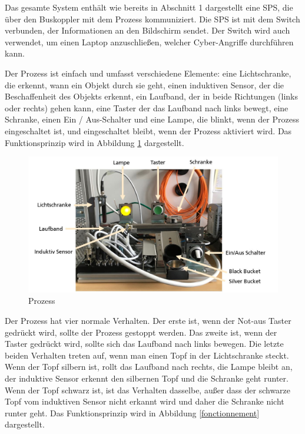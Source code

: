 \documentclass[12pt,a4paper]{scrartcl}
\numberwithin{equation}{section}
\begin{document}
Das gesamte System enthält wie bereits in Abschnitt 1 dargestellt eine SPS, die über den Buskoppler mit dem Prozess kommuniziert. Die SPS ist mit dem Switch verbunden, der Informationen an den Bildschirm sendet. Der Switch wird auch verwendet, um einen Laptop anzuschließen, welcher Cyber-Angriffe durchführen kann.

\vspace*{0.5 cm}

Der Prozess ist einfach und umfasst verschiedene Elemente: eine Lichtschranke, die erkennt, wann ein Objekt durch sie geht, einen induktiven Sensor, der die Beschaffenheit des Objekts erkennt, ein Laufband, der in beide Richtungen (links oder rechts) gehen kann, eine Taster der das Laufband nach links bewegt, eine Schranke, einen Ein / Aus-Schalter und eine Lampe, die blinkt, wenn der Prozess eingeschaltet ist, und eingeschaltet bleibt, wenn der Prozess aktiviert wird. Das Funktionsprinzip wird in Abbildung \ref{prozess_allein} dargestellt.


\begin{figure}[ht!]
	\centering
	  \includegraphics[scale=0.45]{prozess_allein.jpg}
	  \caption{Prozess}
	\label{prozess_allein}
\end{figure}


Der Prozess hat vier normale Verhalten. Der erste ist, wenn der Not-aus Taster gedrückt wird, sollte der Prozess gestoppt werden. Das zweite ist, wenn der Taster gedrückt wird, sollte sich das Laufband nach links bewegen. Die letzte beiden Verhalten treten auf, wenn man einen Topf in der Lichtschranke steckt. Wenn der Topf silbern ist, rollt das Laufband nach rechts, die Lampe bleibt an, der induktive Sensor erkennt den silbernen Topf und die Schranke geht runter. Wenn der Topf schwarz ist, ist das Verhalten dasselbe, außer dass der schwarze Topf vom induktiven Sensor nicht erkannt wird und daher die Schranke nicht runter geht. Das Funktionsprinzip wird in Abbildung \ref{fonctionnement} dargestellt.
\end{document}
